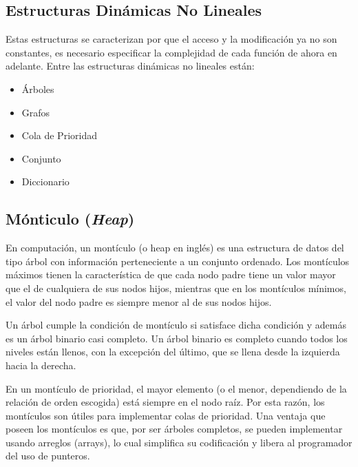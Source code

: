 \subsection{Estructuras Dinámicas No Lineales}

Estas estructuras se caracterizan por que el acceso y la modificación ya no son constantes, es
necesario especificar la complejidad de cada función de ahora en adelante.
Entre las estructuras dinámicas no lineales están:

\begin{itemize}
	\item Árboles
	\item Grafos
	\item Cola de Prioridad
	\item Conjunto
	\item Diccionario
\end{itemize}

\subsection{Mónticulo (\emph{Heap})}
En computación, un montículo (o heap en inglés) es una estructura de datos del tipo árbol con información perteneciente a un conjunto ordenado. Los montículos máximos tienen la característica de que cada nodo padre tiene un valor mayor que el de cualquiera de sus nodos hijos, mientras que en los montículos mínimos, el valor del nodo padre es siempre menor al de sus nodos hijos. 

Un árbol cumple la condición de montículo si satisface dicha condición y además es un árbol binario casi completo. Un árbol binario es completo cuando todos los niveles están llenos, con la excepción del último, que se llena desde la izquierda hacia la derecha. 

En un montículo de prioridad, el mayor elemento (o el menor, dependiendo de la relación de orden escogida) está siempre en el nodo raíz. Por esta razón, los montículos son útiles para implementar colas de prioridad. Una ventaja que poseen los montículos es que, por ser árboles completos, se pueden implementar usando arreglos (arrays), lo cual simplifica su codificación y libera al programador del uso de punteros. 